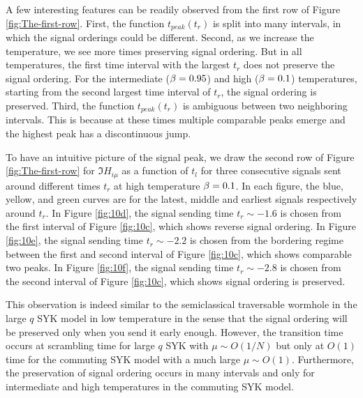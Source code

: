 \documentclass[11pt]{article}
\renewcommand{\>}{\rangle}
\newcommand{\<}{\langle}
\begin{document}
A few interesting features can be readily observed from the first
row of Figure \ref{fig:The-first-row}. First, the function $t_{peak}(t_{r})$
is split into many intervals, in which the signal orderings could
be different. Second, as we increase the temperature, we see more
times preserving signal ordering. But in all temperatures, the first
time interval with the largest $t_{r}$ does not preserve the signal ordering.
For the intermediate ($\beta=0.95$) and high ($\beta=0.1$) temperatures, starting
from the second largest time interval of $t_{r}$, the signal ordering
is preserved. Third, the function $t_{peak}(t_{r})$ is ambiguous
between two neighboring intervals. This is because at these times
multiple comparable peaks emerge and the highest peak has a discontinuous
jump. 

To have an intuitive picture of the signal peak, we draw the second
row of Figure \ref{fig:The-first-row} for $\Im H_{i\mu}$ as a function
of $t_{l}$ for three consecutive signals sent around different times
$t_{r}$ at high temperature $\beta=0.1$. In each figure, the blue,
yellow, and green curves are for the latest, middle and earliest signals
respectively around $t_{r}$. In Figure \ref{fig:10d}, the signal
sending time $t_{r}\sim-1.6$ is chosen from the first interval of
Figure \ref{fig:10c}, which shows reverse signal ordering. In Figure
\ref{fig:10e}, the signal sending time $t_{r}\sim-2.2$ is chosen
from the bordering regime between the first and second interval of Figure
\ref{fig:10c}, which shows comparable two peaks. In Figure \ref{fig:10f},
the signal sending time $t_{r}\sim-2.8$ is chosen from the second
interval of Figure \ref{fig:10c}, which shows signal ordering is
preserved. 

This observation is indeed similar to the semiclassical traversable
wormhole in the large $q$ SYK model in low temperature in the sense that
the signal ordering will be preserved only when you send it early
enough. However, the transition time occurs at scrambling time for
large $q$ SYK with $\mu\sim O(1/N)$ but only at $O(1)$ time for
the commuting SYK model with a much large $\mu\sim O(1)$. Furthermore,
the preservation of signal ordering occurs in many intervals and only
for intermediate and high temperatures in the commuting SYK model.
\end{document}
